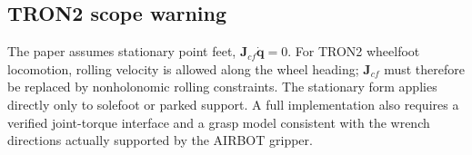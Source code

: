 \documentclass[11pt]{article}
\newcommand{\vect}[1]{\bm{#1}}
\begin{document}
\subsection*{TRON2 scope warning}
The paper assumes stationary point feet, $\vect J_{cf}\dot{\vect q}=0$.
For TRON2 wheelfoot locomotion, rolling velocity is allowed along the wheel
heading; $\vect J_{cf}$ must therefore be replaced by nonholonomic rolling
constraints. The stationary form applies directly only to solefoot or parked
support. A full implementation also requires a verified joint-torque interface
and a grasp model consistent with the wrench directions actually supported by
the AIRBOT gripper.
\end{document}
